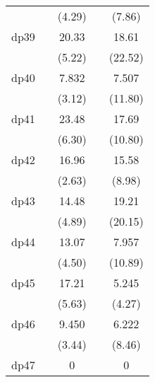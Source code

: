 {\begin{tabular}{l*{4}{c}}
            &                     &      (4.29)         &                     &      (7.86)         \\
[1em]
dp39        &                     &       20.33\sym{***}&                     &       18.61\sym{***}\\
            &                     &      (5.22)         &                     &     (22.52)         \\
[1em]
dp40        &                     &       7.832\sym{**} &                     &       7.507\sym{***}\\
            &                     &      (3.12)         &                     &     (11.80)         \\
[1em]
dp41        &                     &       23.48\sym{***}&                     &       17.69\sym{***}\\
            &                     &      (6.30)         &                     &     (10.80)         \\
[1em]
dp42        &                     &       16.96\sym{**} &                     &       15.58\sym{***}\\
            &                     &      (2.63)         &                     &      (8.98)         \\
[1em]
dp43        &                     &       14.48\sym{***}&                     &       19.21\sym{***}\\
            &                     &      (4.89)         &                     &     (20.15)         \\
[1em]
dp44        &                     &       13.07\sym{***}&                     &       7.957\sym{***}\\
            &                     &      (4.50)         &                     &     (10.89)         \\
[1em]
dp45        &                     &       17.21\sym{***}&                     &       5.245\sym{***}\\
            &                     &      (5.63)         &                     &      (4.27)         \\
[1em]
dp46        &                     &       9.450\sym{***}&                     &       6.222\sym{***}\\
            &                     &      (3.44)         &                     &      (8.46)         \\
[1em]
dp47        &                     &           0         &                     &           0         \\

\end{tabular}}
